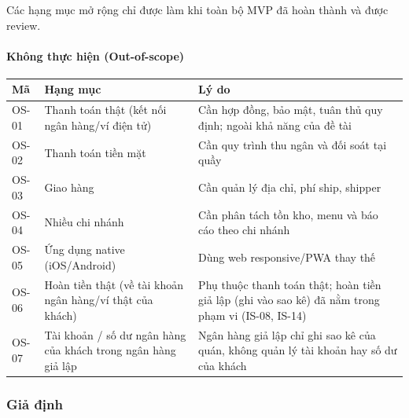 \medskip
Các hạng mục mở rộng chỉ được làm khi toàn bộ MVP đã hoàn thành và được review.

\paragraph{Không thực hiện (Out-of-scope)}

{\small\renewcommand{\arraystretch}{1.25}
\begin{tabularx}{\linewidth}{@{}l X X@{}}
\toprule
\textbf{Mã} & \textbf{Hạng mục} & \textbf{Lý do} \\
\midrule
OS-01 & Thanh toán thật (kết nối ngân hàng/ví điện tử) & Cần hợp đồng, bảo mật, tuân thủ quy định; ngoài khả năng của đề tài \\
OS-02 & Thanh toán tiền mặt & Cần quy trình thu ngân và đối soát tại quầy \\
OS-03 & Giao hàng & Cần quản lý địa chỉ, phí ship, shipper \\
OS-04 & Nhiều chi nhánh & Cần phân tách tồn kho, menu và báo cáo theo chi nhánh \\
OS-05 & Ứng dụng native (iOS/Android) & Dùng web responsive/PWA thay thế \\
OS-06 & Hoàn tiền thật (về tài khoản ngân hàng/ví thật của khách) & Phụ thuộc thanh toán thật; hoàn tiền giả lập (ghi vào sao kê) đã nằm trong phạm vi (IS-08, IS-14) \\
OS-07 & Tài khoản / số dư ngân hàng của khách trong ngân hàng giả lập & Ngân hàng giả lập chỉ ghi sao kê của quán, không quản lý tài khoản hay số dư của khách \\
\bottomrule
\end{tabularx}}

\subsubsection{Giả định}

